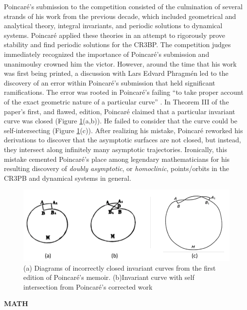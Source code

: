 \documentclass[11pt]{article} %
\begin{document}
Poincaré's submission to the competition consisted of the culmination of several strands of his work from the previous decade, which included geometrical and analytical theory, integral invariants, and periodic solutions to dynamical systems. Poincaré applied these theories in an attempt to rigorously prove stability and find periodic solutions for the CR3BP. The competition judges immediately recognized the importance of Poincaré's submission and unanimoulsy crowned him the victor. However, around the time that his work was first being printed, a discussion with Lars Edvard Phragmén led to the discovery of an error within Poincaré's submission that held significant ramifications. The error was rooted in Poincaré's failing ``to take proper account of the exact geometric nature of a particular curve'' \cite{BarrowGreen1997}. In Theorem III of the paper's first, and flawed, edition, Poincaré claimed that a particular invariant curve was closed (Figure \ref{fig:curveIntersection1}(a,b)). He failed to consider that the curve could be self-intersecting (Figure \ref{fig:curveIntersection1}(c)). After realizing his mistake, Poincaré reworked his derivations to discover that the asymptotic surfaces are not closed, but instead, they intersect along infinitely many asymptotic trajectories. Ironically, this mistake cemented Poincaré's place among legendary mathematicians for his resulting discovery of \textit{doubly asymptotic}, or \textit{homoclinic}, points/orbits in the CR3PB and dynamical systems in general.  

\begin{figure}[H]
\centering
\includegraphics[width=5in]{curveIntersection1.png}\nonumber
\caption{(a) Diagrams of incorrectly closed invariant curves from the first edition of Poincaré's memoir. (b)Invariant curve with self intersection from Poincaré's corrected work \cite{BarrowGreen1997}}
\label{fig:curveIntersection1}
\end{figure}

\color{red}\textbf{MATH}\color{black}
\end{document}
